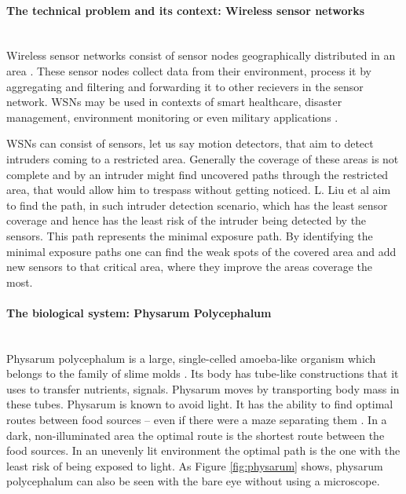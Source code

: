 \documentclass[cameraready]{IWORK2014}
\begin{document}
\paragraph{The technical problem and its context: Wireless sensor networks}~\\
Wireless sensor networks consist of sensor nodes geographically distributed in an area \cite{nazi2013robust}. These sensor nodes collect data from their environment, process it by aggregating and filtering and forwarding it to other recievers in the sensor network. WSNs may be used in contexts of smart healthcare, disaster management, environment monitoring \cite{nazi2013robust} or even military applications \cite{liu2012physarum}.

WSNs can consist of sensors, let us say motion detectors, that aim to detect intruders coming to a restricted area. Generally the coverage of these areas is not complete and by an intruder might find uncovered paths through the restricted area, that would allow him to trespass without getting noticed. L. Liu et al \cite{liu2012physarum} aim to find the path, in such intruder detection scenario, which has the least sensor coverage and hence has the least risk of the intruder being detected by the sensors. This path represents the minimal exposure path. By identifying the minimal exposure paths one can find the weak spots of the covered area and add new sensors to that critical area, where they improve the areas coverage the most.

\paragraph{The biological system: Physarum Polycephalum}~\\
Physarum polycephalum is a large, single-celled amoeba-like organism which belongs to the family of slime molds \cite{liu2012physarum}. Its body has tube-like constructions that it uses to transfer nutrients, signals. Physarum moves by transporting body mass in these tubes. Physarum is known to avoid light. It has the ability to find optimal routes between food sources -- even if there were a maze separating them \cite{nakagaki2000intelligence}. In a dark, non-illuminated area the optimal route is the shortest route between the food sources. In an unevenly lit environment the optimal path is the one with the least risk of being exposed to light. As Figure \ref{fig:physarum} shows, physarum polycephalum can also be seen with the bare eye without using a microscope.
\end{document}

